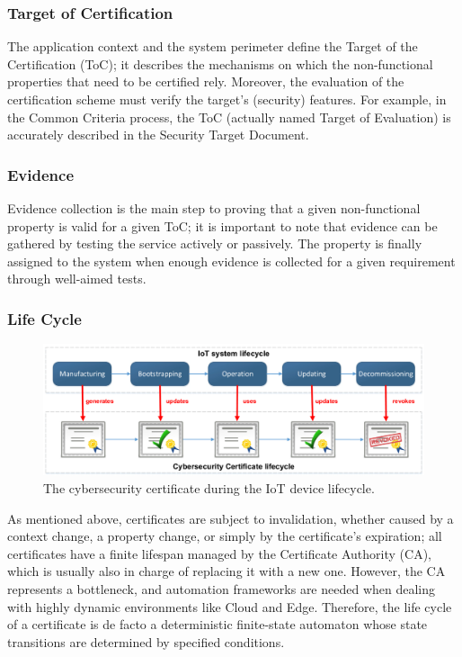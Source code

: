 \subsubsection{Target of Certification}
The application context and the system perimeter define the Target of the Certification (ToC); it describes the mechanisms on which the non-functional properties that need to be certified rely. Moreover, the evaluation of the certification scheme must verify the target’s (security) features. For example, in the Common Criteria process, the ToC (actually named Target of Evaluation) is accurately described in the Security Target Document.

\subsubsection{Evidence}
Evidence collection is the main step to proving that a given non-functional property is valid for a given ToC; it is important to note that evidence can be gathered by testing the service actively or passively. 
The property is finally assigned to the system when enough evidence is collected for a given requirement through well-aimed tests. 


\subsubsection{Life Cycle}
\begin{figure}[hb]
    \centering
    \includegraphics[scale=0.5]{images/lifeCycle.png}
    \caption{The cybersecurity certificate during the IoT device lifecycle.}
    \label{fig:lifecycle}
\end{figure}
As mentioned above, certificates are subject to invalidation, whether caused by a context change, a property change, or simply by the certificate's expiration; all certificates have a finite lifespan managed by the Certificate Authority (CA), which is usually also in charge of replacing it with a new one. However, the CA represents a bottleneck, and automation frameworks are needed when dealing with highly dynamic environments like Cloud and Edge. Therefore, the life cycle of a certificate is de facto a deterministic finite-state automaton whose state transitions are determined by specified conditions.

